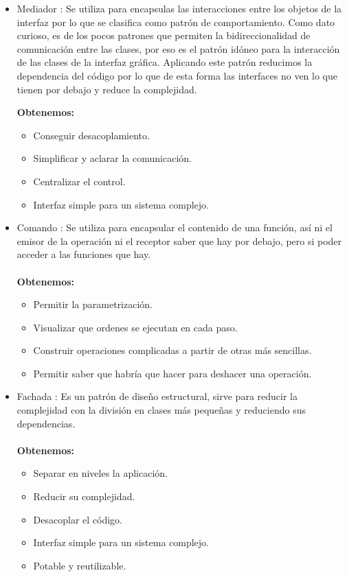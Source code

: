 \begin{itemize}
\item Mediador \cite{wiki:Mediador}: Se utiliza para encapsulas las interacciones entre los objetos de la interfaz por lo que se clasifica como patrón de comportamiento.
Como dato curioso, es de los pocos patrones que permiten la bidireccionalidad de comunicación entre las clases, por eso es el patrón idóneo para la interacción de las clases de la interfaz gráfica.
Aplicando este patrón reducimos la dependencia del código por lo que de esta forma las interfaces no ven lo que tienen por debajo y reduce la complejidad.

\textbf{Obtenemos:}
\begin{itemize}
\item Conseguir desacoplamiento.
\item Simplificar y aclarar la comunicación.
\item Centralizar el control.
\item Interfaz simple para un sistema complejo.
\end{itemize}

\item Comando \cite{wiki:Comando}: Se utiliza para encapsular el contenido de una función, así ni el emisor de la operación ni el receptor saber que hay por debajo, pero si poder acceder a las funciones que hay.\\\\
\textbf{Obtenemos:}
\begin{itemize}
\item Permitir la parametrización.
\item Visualizar que ordenes se ejecutan en cada paso.
\item Construir operaciones complicadas a partir de otras más sencillas.
\item Permitir saber que habría que hacer para deshacer una operación.
\end{itemize}
\item Fachada \cite{wiki:Fachada}: Es un patrón de diseño estructural, sirve para reducir la complejidad con la división en clases más pequeñas y reduciendo sus dependencias.\\\\
\textbf{Obtenemos:}
\begin{itemize}
\item Separar en niveles la aplicación.
\item Reducir su complejidad.
\item Desacoplar el código.
\item Interfaz simple para un sistema complejo.
\item Potable y reutilizable.
\end{itemize}
\end{itemize}
